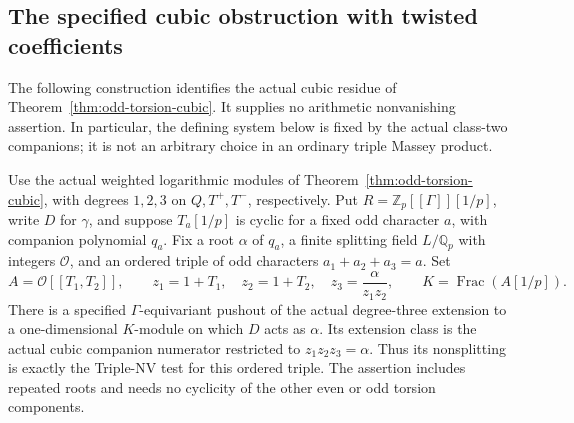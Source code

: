\subsection{The specified cubic obstruction with twisted coefficients}
\label{sec:cubic-twisted-obstruction}

The following construction identifies the actual cubic residue of
Theorem~\ref{thm:odd-torsion-cubic}. It supplies no arithmetic
nonvanishing assertion. In particular, the defining system below is fixed
by the actual class-two companions; it is not an arbitrary choice in an
ordinary triple Massey product.

\begin{proposition}
\label{prop:cubic-triangular}
Use the actual weighted logarithmic modules of
Theorem~\ref{thm:odd-torsion-cubic}, with degrees \(1,2,3\) on
\(Q,T^+,T^-\), respectively. Put
\(R=\mathbb Z_p[[\Gamma]][1/p]\), write \(D\) for \(\gamma\), and suppose
\(T_a[1/p]\) is cyclic for a fixed odd character \(a\), with companion
polynomial \(q_a\). Fix a root \(\alpha\) of \(q_a\), a finite splitting
field \(L/\mathbb Q_p\) with integers \(\mathcal O\), and an ordered
triple of odd characters \(a_1+a_2+a_3=a\). Set
\[
 A=\mathcal O[[T_1,T_2]],\qquad
 z_1=1+T_1,\quad z_2=1+T_2,\quad
 z_3=\frac{\alpha}{z_1z_2},\qquad K=\operatorname{Frac}(A[1/p]).
 \tag{CT.1}
\]
There is a specified \(\Gamma\)-equivariant pushout of the actual
degree-three extension to a one-dimensional \(K\)-module on which
\(D\) acts as \(\alpha\). Its extension class is the actual cubic
companion numerator restricted to \(z_1z_2z_3=\alpha\). Thus its
nonsplitting is exactly the Triple-NV test for this ordered triple.
The assertion includes repeated roots and needs no cyclicity of the
other even or odd torsion components.
\end{proposition}


